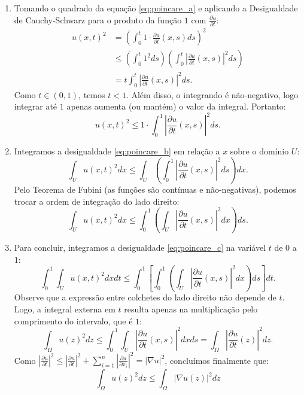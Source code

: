 \documentclass[cs_edp_2026.1.tex]{subfiles} %
\begin{document}
{\begin{enumerate}[label=(\alph*)]
		\item Tomando o quadrado da equação \eqref{eq:poincare_a} e aplicando a Desigualdade de Cauchy-Schwarz para o produto da função $1$ com $\frac{\partial u}{\partial t}$:
		\begin{align*}
			u(x,t)^2 &= \left( \int_0^t 1 \cdot \frac{\partial u}{\partial t}(x,s) ds \right)^2 \\
			&\leq \left( \int_0^t 1^2 ds \right) \left( \int_0^t \left| \frac{\partial u}{\partial t}(x,s) \right|^2 ds \right) \\
			&= t \int_0^t \left| \frac{\partial u}{\partial t}(x,s) \right|^2 ds.
		\end{align*}
		Como $t \in (0,1)$, temos $t < 1$. Além disso, o integrando é não-negativo, logo integrar até $1$ apenas aumenta (ou mantém) o valor da integral. Portanto:
		\begin{equation} \label{eq:poincare_b}
			u(x,t)^2 \leq 1 \cdot \int_0^1 \left| \frac{\partial u}{\partial t}(x,s) \right|^2 ds.
		\end{equation}
		
		\item Integramos a desigualdade \eqref{eq:poincare_b} em relação a $x$ sobre o domínio $U$:
		$$\int_U u(x,t)^2 dx \leq \int_U \left( \int_0^1 \left| \frac{\partial u}{\partial t}(x,s) \right|^2 ds \right) dx.$$
		Pelo Teorema de Fubini (as funções são contínuas e não-negativas), podemos trocar a ordem de integração do lado direito:
		\begin{equation} \label{eq:poincare_c}
			\int_U u(x,t)^2 dx \leq \int_0^1 \left( \int_U \left| \frac{\partial u}{\partial t}(x,s) \right|^2 dx \right) ds.
		\end{equation}
		
		\item Para concluir, integramos a desigualdade \eqref{eq:poincare_c} na variável $t$ de $0$ a $1$:
		$$\int_0^1 \int_U u(x,t)^2 dx dt \leq \int_0^1 \left[ \int_0^1 \left( \int_U \left| \frac{\partial u}{\partial t}(x,s) \right|^2 dx \right) ds \right] dt.$$
		Observe que a expressão entre colchetes do lado direito não depende de $t$. Logo, a integral externa em $t$ resulta apenas na multiplicação pelo comprimento do intervalo, que é $1$:
		$$\int_\Omega u(z)^2 dz \leq \int_0^1 \int_U \left| \frac{\partial u}{\partial t}(x,s) \right|^2 dx ds = \int_\Omega \left| \frac{\partial u}{\partial t}(z) \right|^2 dz.$$
		Como $\left| \frac{\partial u}{\partial t} \right|^2 \leq \left| \frac{\partial u}{\partial t} \right|^2 + \sum_{i=1}^n \left| \frac{\partial u}{\partial x_i} \right|^2 = |\nabla u|^2$, concluímos finalmente que:
		\begin{equation*}
			\boxed{\int_\Omega u(z)^2 dz \leq \int_\Omega |\nabla u(z)|^2 dz}
		\end{equation*}
		

\end{enumerate}}
\end{document}
